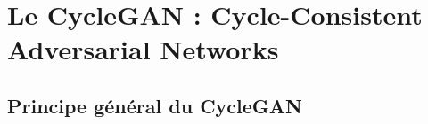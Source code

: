 \chapter{Le CycleGAN : Cycle-Consistent Adversarial Networks}

\section{Principe général du CycleGAN}